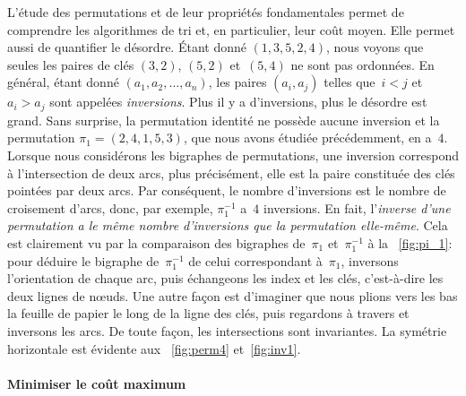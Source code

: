 L'étude des permutations et de leur propriétés fondamentales permet de
comprendre les algorithmes de tri et, en particulier, leur coût
moyen. Elle permet aussi de quantifier le désordre. Étant donné
\((1,3,5,2,4)\), nous voyons que seules les paires de clés \((3,2)\),
\((5,2)\) et~\((5,4)\) ne sont pas ordonnées. En général, étant donné
\((a_1, a_2, \dots, a_n)\), les paires \((a_i,a_j)\) telles que~\(i <
j\) et~\(a_i > a_j\) sont appelées
\emph{inversions}. Plus il y a
d'inversions, plus le désordre est grand. Sans surprise, la
permutation identité ne possède aucune
inversion et la permutation \(\pi_1 = (2,4,1,5,3)\), que nous avons
étudiée précédemment, en a~\(4\). Lorsque nous considérons les
bigraphes de permutations, une
inversion correspond à l'intersection de
deux arcs, plus précisément, elle est la paire constituée des clés
pointées par deux arcs. Par conséquent, le nombre d'inversions
 est le nombre de croisement d'arcs,
donc, par exemple, \(\pi_1^{-1}\) a~\(4\) inversions. En fait,
l'\emph{inverse d'une permutation a le même
  nombre d'inversions que la
  permutation elle-même}. Cela est clairement vu
par la comparaison des bigraphes
de~\(\pi_1\) et~\(\pi_1^{-1}\) à la \fig~\vref{fig:pi_1}: pour déduire
le bigraphe de~\(\pi_1^{-1}\) de celui correspondant à~\(\pi_1\),
inversons l'orientation de chaque arc, puis échangeons les index et
les clés, c'est-à-dire les deux lignes de n{\oe}uds. Une autre façon
est d'imaginer que nous plions vers les bas la feuille de papier le
long de la ligne des clés, puis regardons à travers et inversons les
arcs. De toute façon, les intersections sont invariantes. La symétrie
horizontale est évidente aux \figs~\ref{fig:perm4} et~\ref{fig:inv1}.

\paragraph{Minimiser le coût maximum}
\label{par:minimax}

